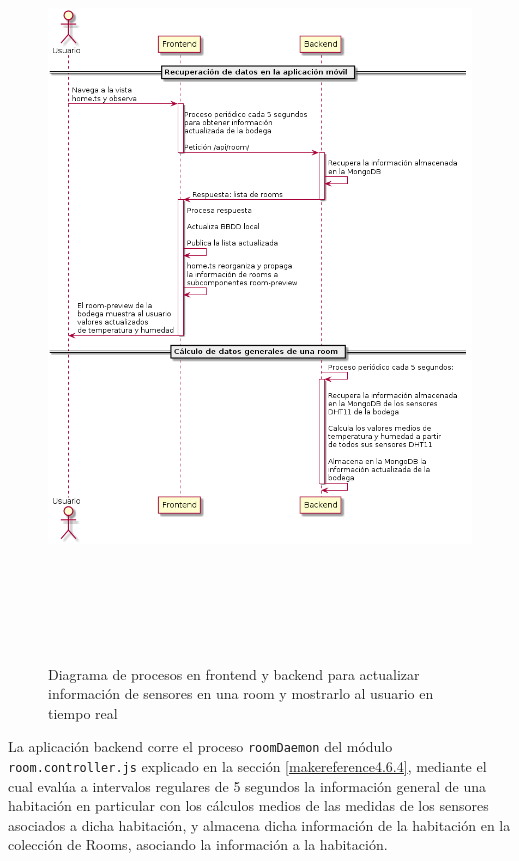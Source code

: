 \begin{figure}[hbt!]
\centering
\label{fig:usecase3sub2}
\includegraphics[height=8in]{figures/diagrams/use-cases/sensorInfo2.png}
\caption[usecase3sub2]{Diagrama de procesos en frontend y backend para actualizar información de sensores en una room y mostrarlo al usuario en tiempo real\footnotemark}
\end{figure}

La aplicación backend corre el proceso \verb|roomDaemon| del módulo \verb|room.controller.js| explicado en la sección \ref{makereference4.6.4}, mediante el cual evalúa a intervalos regulares de 5 segundos la información general de una habitación en particular con los cálculos medios de las medidas de los sensores asociados a dicha habitación, y almacena dicha información de la habitación en la colección de Rooms, asociando la información a la habitación.

